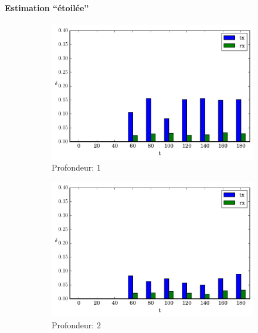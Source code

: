 \paragraph{Estimation ``étoilée''}

\begin{figure}[h]
  \centering
  \begin{subfigure}{0.3\textwidth}
    \includegraphics[width=\textwidth]{img/evolution_noinfo_1.pdf}
    \caption{Profondeur: 1}
    \label{supervision:fig:noinfo_1}
  \end{subfigure}
  \begin{subfigure}{0.3\textwidth}
    \includegraphics[width=\textwidth]{img/evolution_noinfo_2.pdf}
    \caption{Profondeur: 2}
    \label{supervision:fig:noinfo_2}
  \end{subfigure}
  \begin{subfigure}{0.3\textwidth}

\end{subfigure}
\end{figure}
